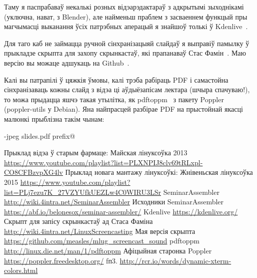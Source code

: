 \documentclass[10pt, a5paper]{article}
\begin{document}
Таму я паспрабаваў некалькі розных відэарэдактараў з адкрытымі зыходнікамі (уключна, нават, з Blender), але найменьш праблем з засваеннем функцый пры магчымасці выканання ўсіх патрэбных аперацый я знайшоў толькі ў Kdenlive~\cite{Zakharevich5}.

Для таго каб не займацца ручной  сінхранізацыяй слайдаў я выправіў памылку ў прыкладзе скрыпта для захопу скрынкастаў, які прапанаваў Стас Фамін~\cite{Zakharevich6}. Маю версію вы можаце адшукаць на Github~\cite{Zakharevich7}.

Калі вы патрапілі ў цяжкія ўмовы, калі трэба рабіраць PDF і самастойна сінхранізаваць кожны слайд з відэа ці аўдыёзапісам лектара (шчыра спачуваю!), то можа прыдацца яшчэ такая утылітка, як pdftoppm~\cite{Zakharevich8} з пакету Poppler~\cite{Zakharevich9} (poppler-utils у Debian). Яна найпрасцей разбірае PDF на прыстойнай якасці малюнкі прыблізна такім чынам:

\verb@pdftoppm -jpeg slides.pdf prefix@

\begin{thebibliography}{99}
 Прыклад відэа ў старым фармаце: Майская лінуксоўка 2013 \url{https://www.youtube.com/playlist?list=PLXNPIJ8clv69tRLxpl-CO8CFBzvpXG4lv}
 Прыклад новага мантажу лінуксоўкі: Жнівеньская лінуксоўка 2015 \url{https://www.youtube.com/playlist?list=PLj7ezu7K_27VZYUfkUEZLw4C0WIRU3LSr}
 SeminarAssembler \url{http://wiki.4intra.net/SeminarAssembler}
 Исходники SeminarAssembler \url{https://abf.io/belonesox/seminar-assembler/}
 Kdenlive \url{https://kdenlive.org/}
 Скрыпт для запісу скрынкастаў ад Стаса Фаміна \url{http://wiki.4intra.net/LinuxScreencasting}
 Мая версія скрыпта \url{https://github.com/measles/mlug_screencast_sound}
 pdftoppm \url{http://linux.die.net/man/1/pdftoppm}
 Афіцыйная старонка Poppler \url{https://poppler.freedesktop.org/}
 fп3. \url{http://rcr.io/words/dynamic-xterm-colors.html}
\end{thebibliography}
\end{document}
